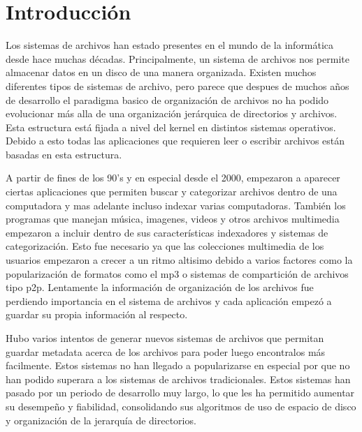 \chapter{Introducción}
\ifpdf
    \graphicspath{{Introduction/IntroductionFigs/PNG/}{Introduction/IntroductionFigs/PDF/}{Introduction/IntroductionFigs/}}
\else
    \graphicspath{{Introduction/IntroductionFigs/EPS/}{Introduction/IntroductionFigs/}}
\fi

Los sistemas de archivos han estado presentes en el mundo de la informática desde hace muchas décadas. Principalmente, un sistema de archivos nos permite almacenar datos en un disco de una manera organizada. Existen muchos diferentes tipos de sistemas de archivo, pero parece que despues de muchos años de desarrollo el paradigma basico de organización de archivos no ha podido evolucionar más alla de una organización jerárquica de directorios y archivos. Esta estructura está fijada a nivel del kernel en distintos sistemas operativos. Debido a esto todas las aplicaciones que requieren leer o escribir archivos están basadas en esta estructura.

A partir de fines de los 90's y en especial desde el 2000, empezaron a aparecer ciertas aplicaciones que permiten buscar y categorizar archivos dentro de una computadora y mas adelante incluso indexar varias computadoras. También los programas que manejan música, imagenes, videos y otros archivos multimedia empezaron a incluir dentro de sus características indexadores y sistemas de categorización. Esto fue necesario ya que las colecciones multimedia de los usuarios empezaron a crecer a un ritmo altisimo debido a varios factores como la popularización de formatos como el mp3 o sistemas de compartición de archivos tipo p2p. Lentamente la información de organización de los archivos fue perdiendo importancia en el sistema de archivos y cada aplicación empezó a guardar su propia información al respecto.

Hubo varios intentos de generar nuevos sistemas de archivos que permitan guardar metadata acerca de los archivos para poder luego encontralos más facilmente. Estos sistemas no han llegado a popularizarse en especial por que no han podido superara a los sistemas de archivos tradicionales. Estos sistemas han pasado por un periodo de desarrollo muy largo, lo que les ha permitido aumentar su desempeño y fiabilidad, consolidando sus algoritmos de uso de espacio de disco y organización de la jerarquía de directorios.

